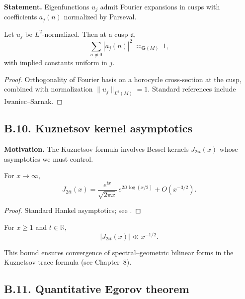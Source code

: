 \noindent
\textbf{Statement.}
Eigenfunctions $u_j$ admit Fourier expansions in cusps with coefficients $a_j(n)$ normalized by Parseval.

\begin{lemma}\label{lem:B-parseval}
Let $u_j$ be $L^2$-normalized. Then at a cusp $\mathfrak a$,
\[
\sum_{n\neq 0} |a_j(n)|^2\ \asymp_{\mathbf{G}(M)}\ 1,
\]
with implied constants uniform in $j$.
\end{lemma}

\begin{proof}
Orthogonality of Fourier basis on a horocycle cross-section at the cusp, combined with normalization $\|u_j\|_{L^2(M)}=1$. Standard references include Iwaniec–Sarnak.
\end{proof}

\bigskip
\subsection*{B.10. Kuznetsov kernel asymptotics}

\noindent
\textbf{Motivation.}
The Kuznetsov formula involves Bessel kernels $J_{2it}(x)$ whose asymptotics we must control.

\begin{lemma}\label{lem:B-bessel}
For $x\to\infty$,
\[
J_{2it}(x)=\frac{e^{ix}}{\sqrt{2\pi x}}\,e^{2it\log(x/2)}+O(x^{-3/2}).
\]
\end{lemma}

\begin{proof}
Standard Hankel asymptotics; see \cite[§8.451]{GradshteynRyzhik}.
\end{proof}

\begin{corollary}\label{cor:B-kuz-kernel}
For $x\ge 1$ and $t\in\mathbb{R}$,
\[
|J_{2it}(x)| \ll x^{-1/2}.
\]
\end{corollary}

\begin{remark}[Implication]\label{rem:B-kuznetsov}
This bound ensures convergence of spectral–geometric bilinear forms in the Kuznetsov trace formula (see Chapter~8).
\end{remark}

\bigskip
\subsection*{B.11. Quantitative Egorov theorem}

